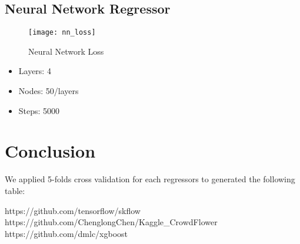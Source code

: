 \documentclass[journal]{IEEEtran}
\begin{document}
\subsection{Neural Network Regressor}
\begin{figure}[htbp] 
\centering\texttt{[image: nn\_loss]} 
\caption{Neural Network Loss}\label{fig:10} 
\end{figure} 
\begin{itemize}
\item{Layers: 4}
\item{Nodes: 50/layers}
\item{Steps: 5000}
\end{itemize}
\section{Conclusion}
We applied 5-folds cross validation for each regressors to generated the following table:


\ifCLASSOPTIONcaptionsoff
  \newpage
\fi




\begin{thebibliography}{1}

https://github.com/tensorflow/skflow
https://github.com/ChenglongChen/Kaggle\_CrowdFlower
https://github.com/dmlc/xgboost

\end{thebibliography}
\end{document}
